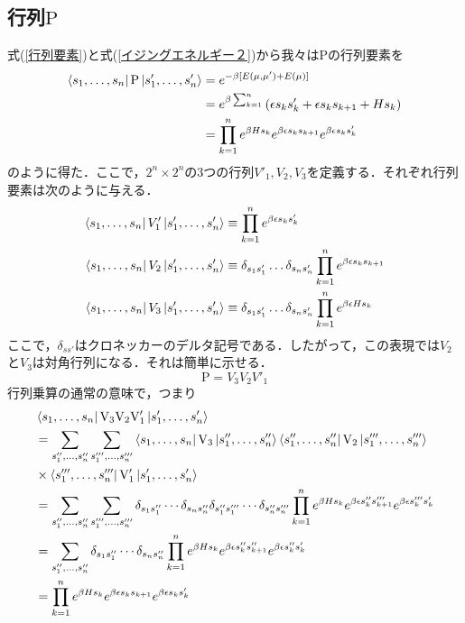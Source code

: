 \documentclass[a4paper,11pt]{jsreport}
\begin{document}
\subsection{行列$\mathrm{P}$}
式(\ref{行列要素})と式(\ref{イジングエネルギー２})から我々は$\mathrm{P}$の行列要素を
\begin{align}
  \bra{s_1,\dots,s_n}\mathrm{P}\ket{s'_1,\dots,s'_n}
   & = e^{-\beta[E(\mu, \mu') + E(\mu)]} \notag                                                        \\
   & = e^{\beta \sum_{k=1}^{n}} \left( \epsilon s_k s'_k + \epsilon s_k s_{k+1} + H s_k \right) \notag \\
   & = \prod_{k=1}^n e^{\beta H s_k} e^{\beta \epsilon s_k s_{k+1}} e^{\beta \epsilon s_k s'_k}
\end{align}
のように得た．ここで，$2^n \times 2^n$の3つの行列$V'_1, V_2, V_3$を定義する．それぞれ行列要素は次のように与える．
\begin{align}
  \bra{s_1,\dots,s_n}V'_1\ket{s'_1,\dots,s'_n}
   & \equiv \prod_{k=1}^n e^{\beta \epsilon s_k s'_k} \label{V1}                                 \\
  \bra{s_1,\dots,s_n}V_2\ket{s'_1,\dots,s'_n}
   & \equiv \delta_{s_1 s'_1}\dots\delta_{s_n s'_n} \prod_{k=1}^n e^{\beta \epsilon s_k s_{k+1}} \\
  \bra{s_1,\dots,s_n}V_3\ket{s'_1,\dots,s'_n}
   & \equiv \delta_{s_1 s'_1}\dots\delta_{s_n s'_n} \prod_{k=1}^n e^{\beta \epsilon H s_k}       \\
\end{align}
ここで，$\delta_{ss'}$はクロネッカーのデルタ記号である．したがって，この表現では$V_2$と$V_3$は対角行列になる．それは簡単に示せる．
\begin{equation}
  \mathrm{P} = V_3 V_2 V'_1
\end{equation}
行列乗算の通常の意味で，つまり
\begin{align*}
  & \bra{s_1,\dots,s_n}\mathrm{V}_3\mathrm{V}_2\mathrm{V}'_1\ket{s'_1,\dots,s'_n}                                                            \\
  & = \sum_{s''_1, \dots, s''_n} \sum_{s'''_1, \dots, s'''_n} \bra{s_1,\dots,s_n}\mathrm{V}_3\ket{s''_1,\dots,s''_n} \bra{s''_1,\dots,s''_n}\mathrm{V}_2\ket{s'''_1,\dots,s'''_n}       \\
  & \times \bra{s'''_1,\dots,s'''_n}\mathrm{V}'_1\ket{s'_1,\dots,s'_n} \\
  & = \sum_{s''_1, \dots, s''_n} \sum_{s'''_1, \dots, s'''_n}
  \delta_{s_1s''_1} \cdots \delta_{s_ns''_n} \delta_{s''_1s'''_1} \cdots \delta_{s''_ns'''_n} \prod_{k =1}^{n} e^{\beta H s_k} e^{\beta \epsilon s''_k s'''_{k+1}} e^{\beta \epsilon s'''_k s'_k} \\
  & = \sum_{s''_1, \dots, s''_n} 
  \delta_{s_1s''_1} \cdots \delta_{s_ns''_n} \prod_{k =1}^{n} e^{\beta H s_k} e^{\beta \epsilon s''_k s''_{k+1}} e^{\beta \epsilon s''_k s'_k} \\
  & = \prod_{k =1}^{n} e^{\beta H s_k} e^{\beta \epsilon s_k s_{k+1}} e^{\beta \epsilon s_k s'_k}
\end{align*}
\end{document}
